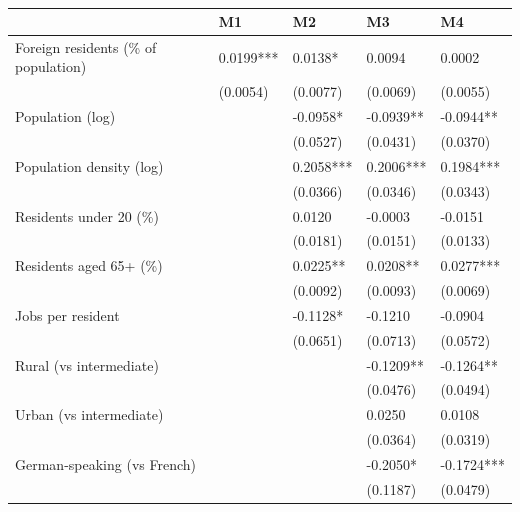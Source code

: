 \begin{table}
\caption{}
\label{}
\begin{center}
\begin{tabular}{lllll}
\hline
                                     & M1        & M2        & M3        & M4          \\
\hline
Foreign residents (\% of population) & 0.0199*** & 0.0138*   & 0.0094    & 0.0002      \\
                                     & (0.0054)  & (0.0077)  & (0.0069)  & (0.0055)    \\
Population (log)                     &           & -0.0958*  & -0.0939** & -0.0944**   \\
                                     &           & (0.0527)  & (0.0431)  & (0.0370)    \\
Population density (log)             &           & 0.2058*** & 0.2006*** & 0.1984***   \\
                                     &           & (0.0366)  & (0.0346)  & (0.0343)    \\
Residents under 20 (\%)              &           & 0.0120    & -0.0003   & -0.0151     \\
                                     &           & (0.0181)  & (0.0151)  & (0.0133)    \\
Residents aged 65+ (\%)              &           & 0.0225**  & 0.0208**  & 0.0277***   \\
                                     &           & (0.0092)  & (0.0093)  & (0.0069)    \\
Jobs per resident                    &           & -0.1128*  & -0.1210   & -0.0904     \\
                                     &           & (0.0651)  & (0.0713)  & (0.0572)    \\
Rural (vs intermediate)              &           &           & -0.1209** & -0.1264**   \\
                                     &           &           & (0.0476)  & (0.0494)    \\
Urban (vs intermediate)              &           &           & 0.0250    & 0.0108      \\
                                     &           &           & (0.0364)  & (0.0319)    \\
German-speaking (vs French)          &           &           & -0.2050*  & -0.1724***  \\
                                     &           &           & (0.1187)  & (0.0479)    \\

\end{tabular}
\end{center}
\end{table}

